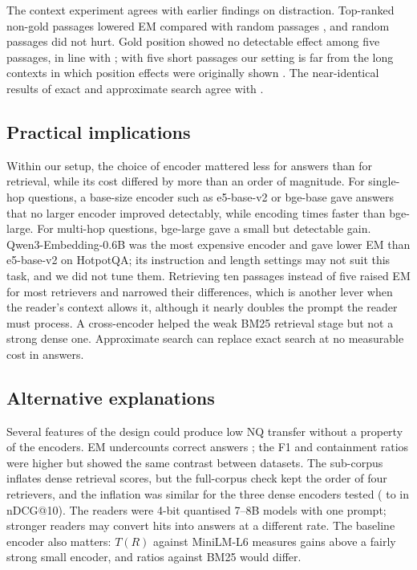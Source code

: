 The context experiment agrees with earlier findings on distraction. Top-ranked non-gold passages lowered EM compared with random passages \citep{cuconasu2024power,amiraz2025distracting,repantis2026competition}, and random passages did not hurt. Gold position showed no detectable effect among five passages, in line with \citet{cuconasu2025positional}; with five short passages our setting is far from the long contexts in which position effects were originally shown \citep{liu2024lost}. The near-identical results of exact and approximate search agree with \citet{leto2024toward}.

\subsection{Practical implications}
Within our setup, the choice of encoder mattered less for answers than for retrieval, while its cost differed by more than an order of magnitude. For single-hop questions, a base-size encoder such as e5-base-v2 or bge-base gave answers that no larger encoder improved detectably, while encoding  times faster than bge-large. For multi-hop questions, bge-large gave a small but detectable gain. Qwen3-Embedding-0.6B was the most expensive encoder and gave lower EM than e5-base-v2 on HotpotQA; its instruction and length settings may not suit this task, and we did not tune them. Retrieving ten passages instead of five raised EM for most retrievers and narrowed their differences, which is another lever when the reader's context allows it, although it nearly doubles the prompt the reader must process. A cross-encoder helped the weak BM25 retrieval stage but not a strong dense one. Approximate search can replace exact search at no measurable cost in answers.

\subsection{Alternative explanations}
Several features of the design could produce low NQ transfer without a property of the encoders. EM undercounts correct answers \citep{kamalloo2023}; the F1 and containment ratios were higher but showed the same contrast between datasets. The sub-corpus inflates dense retrieval scores, but the full-corpus check kept the order of four retrievers, and the inflation was similar for the three dense encoders tested ( to  in nDCG@10). The readers were 4-bit quantised 7--8B models with one prompt; stronger readers may convert hits into answers at a different rate. The baseline encoder also matters: $T(R)$ against MiniLM-L6 measures gains above a fairly strong small encoder, and ratios against BM25 would differ.
